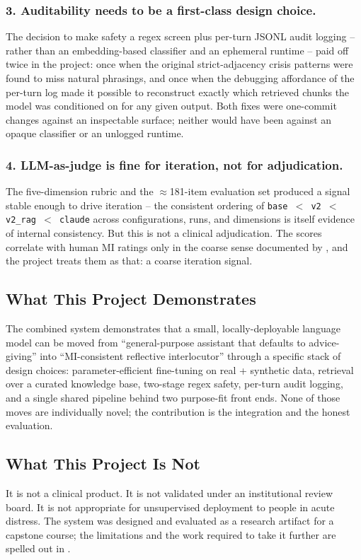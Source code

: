 \subsubsection*{3. Auditability needs to be a first-class design choice.}
The decision to make safety a regex screen plus per-turn JSONL audit logging
-- rather than an embedding-based classifier and an ephemeral runtime --
paid off twice in the project: once when the original strict-adjacency
crisis patterns were found to miss natural phrasings, and once when the
debugging affordance of the per-turn log made it possible to reconstruct
exactly which retrieved chunks the model was conditioned on for any given
output. Both fixes were one-commit changes against an inspectable surface;
neither would have been against an opaque classifier or an unlogged runtime.

\subsubsection*{4. LLM-as-judge is fine for iteration, not for adjudication.}
The five-dimension rubric and the $\approx$181-item evaluation set produced a
signal stable enough to drive iteration -- the consistent ordering of
\texttt{base $<$ v2 $<$ v2\_rag $<$ claude} across configurations, runs, and
dimensions is itself evidence of internal consistency. But this is not a
clinical adjudication. The scores correlate with human MI ratings only in the
coarse sense documented by \cite{zheng2023judging,chiang2023closer}, and the
project treats them as that: a coarse iteration signal.

\subsection*{What This Project Demonstrates}

The combined system demonstrates that a small, locally-deployable language
model can be moved from ``general-purpose assistant that defaults to
advice-giving'' into ``MI-consistent reflective interlocutor'' through a
specific stack of design choices: parameter-efficient fine-tuning on real +
synthetic data, retrieval over a curated knowledge base, two-stage regex
safety, per-turn audit logging, and a single shared pipeline behind two
purpose-fit front ends. None of those moves are individually novel; the
contribution is the integration and the honest evaluation.

\subsection*{What This Project Is Not}

It is not a clinical product. It is not validated under an institutional
review board. It is not appropriate for unsupervised deployment to people in
acute distress. The system was designed and evaluated as a research artifact
for a capstone course; the limitations and the work required to take it
further are spelled out in .
